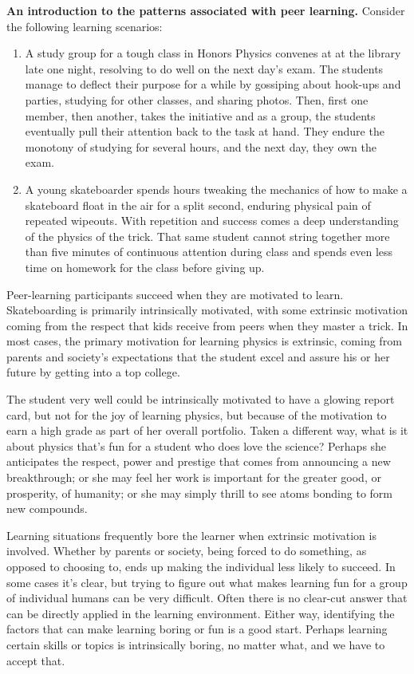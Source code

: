 \textbf{An introduction to the \textbf{patterns} associated with peer
learning.} Consider the following learning scenarios:

\begin{enumerate}
\item
  A study group for a tough class in Honors Physics convenes at at the
  library late one night, resolving to do well on the next day's exam.
  The students manage to deflect their purpose for a while by gossiping
  about hook-ups and parties, studying for other classes, and sharing
  photos. Then, first one member, then another, takes the initiative and
  as a group, the students eventually pull their attention back to the
  task at hand. They endure the monotony of studying for several hours,
  and the next day, they own the exam.
\item
  A young skateboarder spends hours tweaking the mechanics of how to
  make a skateboard float in the air for a split second, enduring
  physical pain of repeated wipeouts. With repetition and success comes
  a deep understanding of the physics of the trick. That same student
  cannot string together more than five minutes of continuous attention
  during class and spends even less time on homework for the class
  before giving up.
\end{enumerate}
Peer-learning participants succeed when they are motivated to learn.
Skateboarding is primarily intrinsically motivated, with some extrinsic
motivation coming from the respect that kids receive from peers when
they master a trick. In most cases, the primary motivation for learning
physics is extrinsic, coming from parents and society's expectations
that the student excel and assure his or her future by getting into a
top college.

The student very well could be intrinsically motivated to have a glowing
report card, but not for the joy of learning physics, but because of the
motivation to earn a high grade as part of her overall portfolio. Taken
a different way, what is it about physics that's fun for a student who
does love the science? Perhaps she anticipates the respect, power and
prestige that comes from announcing a new breakthrough; or she may feel
her work is important for the greater good, or prosperity, of humanity;
or she may simply thrill to see atoms bonding to form new compounds.

Learning situations frequently bore the learner when extrinsic
motivation is involved. Whether by parents or society, being forced to
do something, as opposed to choosing to, ends up making the individual
less likely to succeed. In some cases it's clear, but trying to figure
out what makes learning fun for a group of individual humans can be very
difficult. Often there is no clear-cut answer that can be directly
applied in the learning environment. Either way, identifying the factors
that can make learning boring or fun is a good start. Perhaps learning
certain skills or topics is intrinsically boring, no matter what, and we
have to accept that.


